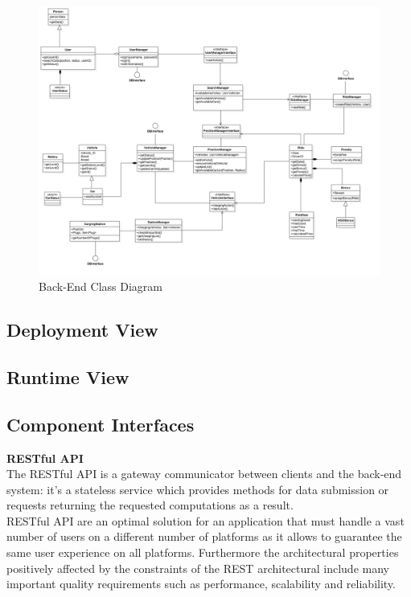 \FloatBarrier
\clearpage
\FloatBarrier
\begin{figure}
\includegraphics[scale=0.4]{Images/ClassDiagram/BackEnd.png}
\caption{Back-End Class Diagram}
\end{figure}
\FloatBarrier


\subsection{Deployment View}

\subsection{Runtime View}
\newpage
\subsection{Component Interfaces}
\label{sec:CInter}

\textbf{RESTful API}\\The RESTful API is a gateway communicator between clients and the back-end system: it's a stateless service which provides methods for data submission or requests returning the requested computations as a result.\\
RESTful API are an optimal solution for an application that must handle a vast number of users on a different number of platforms as it allows to guarantee the same user experience on all platforms. Furthermore the architectural properties positively affected by the constraints of the REST architectural include many important quality requirements such as performance, scalability and reliability.
\newpage
